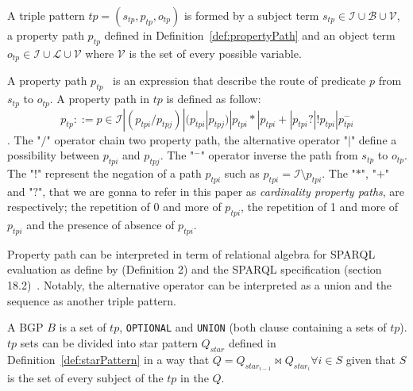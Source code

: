 \begin{definition}\label{def:triplePattern}
    A triple pattern $tp = (s_{tp},p_{tp},o_{tp})$ is formed by a subject term $s_{tp} \in \mathcal{I} \cup \mathcal{B} \cup \mathcal{V}$, 
    a property path  $p_{tp}$ defined in Definition~\ref{def:propertyPath} and an object term  $o_{tp} \in \mathcal{I} \cup \mathcal{L} \cup \mathcal{V}$ 
    where $\mathcal{V}$ is the set of every possible variable. 
\end{definition}

\begin{definition}\label{def:propertyPath}
   A property path $p_{tp}$~\cite{Kostylev2015} is an expression that describe the route of predicate $p$ from $s_{tp}$ to $o_{tp}$.
   A property path in $tp$ is defined as follow:
   \begin{equation}
    p_{tp} ::= p \in \mathcal{I} | (p_{tpi}/p_{tpj}) | (p_{tpi}|p_{tpj}) | p_{tpi}* | p_{tpi}+ | p_{tpi}? | !p_{tpi}| p_{tpi}^{-}
   \end{equation}.
   The "$/$" operator chain two property path, the alternative operator "$|$" define a possibility between $p_{tpi}$ and $p_{tpj}$.
   The "$^-$" operator inverse the path from $s_{tp}$ to $o_{tp}$.
   The "$!$" represent the negation of a path $p_{tpi}$ such as $p_{tpi} = \mathcal{I} \setminus p_{tpi}$.
   The "$*$", "$+$" and "$?$", that we are gonna to refer in this paper as \emph{cardinality property paths}, are respectively; the repetition of 0 and more of $p_{tpi}$, 
   the repetition of 1 and more of $p_{tpi}$ and the presence of absence of $p_{tpi}$.
\end{definition}

Property path can be interpreted in term of relational algebra for SPARQL evaluation as define by \citeauthor{Kostylev2015} (Definition 2) and the SPARQL specification (section 18.2)~.
Notably, the alternative operator can be interpreted as a union and the sequence as another triple pattern.

\begin{definition}[BGP]\label{def:bgp}
 A BGP $B$ is a set of $tp$, \texttt{OPTIONAL} and \texttt{UNION} (both clause containing a sets of $tp$).
 $tp$ sets can be divided into star pattern $Q_{star}$ defined in Definition~\ref{def:starPattern} in a way 
 that $Q = Q_{star_{i-1}} \bowtie Q_{star_i} \forall i \in S$ given that $S$ is the set of every subject of the $tp$ in the $Q$.
\end{definition}

